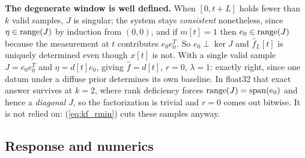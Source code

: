 \documentclass{article}
\numberwithin{equation}{section}   %
\begin{document}
{\bf The degenerate window is well defined.}  When $[0,t+L]$ holds fewer than $k$ valid samples, $J$ is
singular; the system stays {\em consistent} nonetheless, since $\eta \in {\rm range}(J)$ by induction from
$(0,0)$, and if $m[t]=1$ then $e_0 \in {\rm range}(J)$ because the measurement at $t$ contributes $e_0e_0^T$.
So $e_0 \perp \ker J$ and $\hat f_L[t]$ is uniquely determined even though $x[t]$ is not.  With a single valid
sample $J = e_0e_0^T$ and $\eta = d[t]e_0$, giving $\hat f = d[t]$, $r = 0$, $\lambda = 1$: exactly right,
since one datum under a diffuse prior determines its own baseline.  In float32 that exact answer survives at
$k=2$, where rank deficiency forces ${\rm range}(J) = {\rm span}(e_0)$ and hence a {\em diagonal} $J$, so the
factorization is trivial and $r = 0$ comes out bitwise.  It is not relied on: (\ref{eq:kf_rmin}) cuts these
samples anyway.

\subsection{Response and numerics}
\label{sec:kf_numerics}
\end{document}

